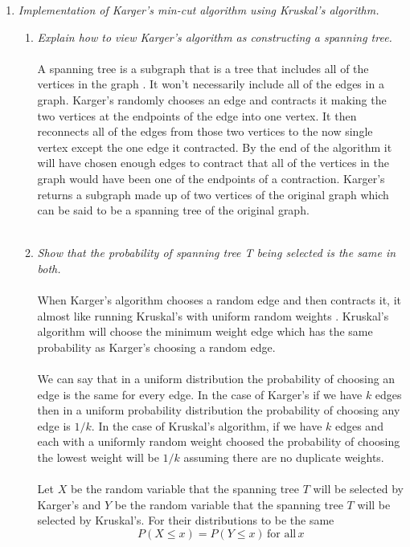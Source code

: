 \documentclass[12pt]{article}
\begin{document}
\begin{enumerate}
		\newpage
		\item \textit{Implementation of Karger's min-cut algorithm using Kruskal's algorithm.}
		\begin{enumerate}
			\item \textit{Explain how to view Karger’s algorithm as constructing a spanning tree.}\\
			\\
			A spanning tree is a subgraph that is a tree that includes all of the vertices in the graph \cite{6}.  It won't necessarily include all of the edges in a graph.  Karger's randomly chooses an edge and contracts it making the two vertices at the endpoints of the edge into one vertex.  It then reconnects all of the edges from those two vertices to the now single vertex except the one edge it contracted.  By the end of the algorithm it will have chosen enough edges to contract that all of the vertices in the graph would have been one of the endpoints of a contraction.  Karger's returns a subgraph made up of two vertices of the original graph which can be said to be a spanning tree of the original graph.\\   
			\\
			\item \textit{Show that the probability of spanning tree T being selected is the same in both.}\\
			\\
			When Karger's algorithm chooses a random edge and then contracts it, it almost like running Kruskal's with uniform random weights \cite{5}.  Kruskal's algorithm will choose the minimum weight edge which has the same probability as Karger's choosing a random edge.\\  
			\\
			We can say that in a uniform distribution the probability of choosing an edge is the same for every edge.  In the case of Karger's if we have $k$ edges then in a uniform probability distribution the probability of choosing any edge is $1/k$.  In the case of Kruskal's algorithm, if we have $k$ edges and each with a uniformly random weight choosed the probability of choosing the lowest weight will be $1/k$ assuming there are no duplicate weights.\\
			\\
			Let $X$ be the random variable that the spanning tree $T$ will be selected by Karger's and $Y$ be the random variable that the spanning tree $T$ will be selected by Kruskal's.  For their distributions to be the same \cite{7}
			$$
			P(X \le x) = P(Y \le x) \,\text{for all}\, x
$$
\end{enumerate}
\end{enumerate}
\end{document}

